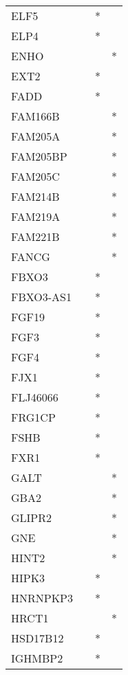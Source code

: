 \begin{longtable}{lccc}
ELF5          &       &  * &         \\
ELP4          &       &  * &         \\
ENHO          &       &    &       * \\
EXT2          &       &  * &         \\
FADD          &       &  * &         \\
FAM166B       &       &    &       * \\
FAM205A       &       &    &       * \\
FAM205BP      &       &    &       * \\
FAM205C       &       &    &       * \\
FAM214B       &       &    &       * \\
FAM219A       &       &    &       * \\
FAM221B       &       &    &       * \\
FANCG         &       &    &       * \\
FBXO3         &       &  * &         \\
FBXO3-AS1     &       &  * &         \\
FGF19         &       &  * &         \\
FGF3          &       &  * &         \\
FGF4          &       &  * &         \\
FJX1          &       &  * &         \\
FLJ46066      &       &  * &         \\
FRG1CP        &       &  * &         \\
FSHB          &       &  * &         \\
FXR1          &       &  * &         \\
GALT          &       &    &       * \\
GBA2          &       &    &       * \\
GLIPR2        &       &    &       * \\
GNE           &       &    &       * \\
HINT2         &       &    &       * \\
HIPK3         &       &  * &         \\
HNRNPKP3      &       &  * &         \\
HRCT1         &       &    &       * \\
HSD17B12      &       &  * &         \\
IGHMBP2       &       &  * &         \\

\end{longtable}
